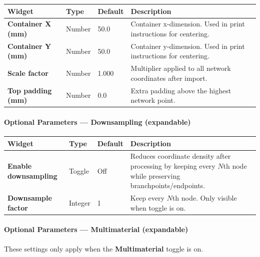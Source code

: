 \documentclass[11pt,letterpaper]{article}
\newcommand{\gui}[1]{\textcolor{guicolor}{\textsf{\textbf{#1}}}}
\begin{document}
\begin{longtable}{@{}L{3.5cm} l l L{5cm}@{}}
\toprule
\textbf{Widget} & \textbf{Type} & \textbf{Default} & \textbf{Description} \\
\midrule
\gui{Container X (mm)} & Number & 50.0 & Container x-dimension. Used in print instructions for centering. \\
\gui{Container Y (mm)} & Number & 50.0 & Container y-dimension. Used in print instructions for centering. \\
\gui{Scale factor} & Number & 1.000 & Multiplier applied to all network coordinates after import. \\
\gui{Top padding (mm)} & Number & 0.0 & Extra padding above the highest network point. \\
\bottomrule
\end{longtable}

\paragraph{Optional Parameters --- Downsampling (expandable)}

\begin{longtable}{@{}L{3.5cm} l l L{5cm}@{}}
\toprule
\textbf{Widget} & \textbf{Type} & \textbf{Default} & \textbf{Description} \\
\midrule
\gui{Enable downsampling} & Toggle & Off & Reduces coordinate density after processing by keeping every $N$th node while preserving branchpoints/endpoints. \\
\gui{Downsample factor} & Integer & 1 & Keep every $N$th node. Only visible when toggle is on. \\
\bottomrule
\end{longtable}

\paragraph{Optional Parameters --- Multimaterial (expandable)}

These settings only apply when the \gui{Multimaterial} toggle is on.
\end{document}
